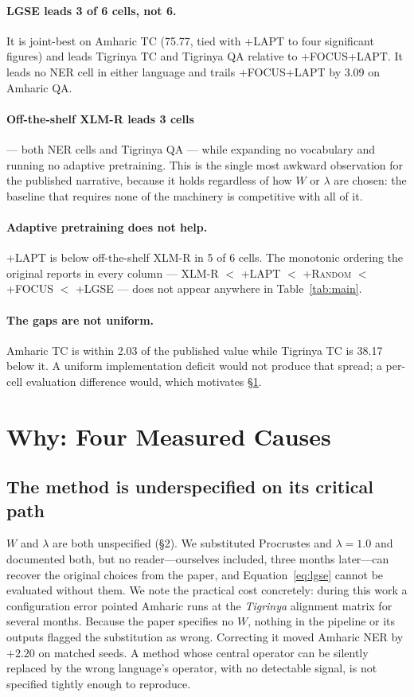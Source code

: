 \documentclass[11pt]{article}
\begin{document}
\paragraph{LGSE leads 3 of 6 cells, not 6.} It is joint-best on Amharic TC
(75.77, tied with \textsc{+LAPT} to four significant figures) and leads
Tigrinya TC and Tigrinya QA relative to \textsc{+FOCUS+LAPT}. It leads no
NER cell in either language and trails \textsc{+FOCUS+LAPT} by 3.09 on
Amharic QA.

\paragraph{Off-the-shelf XLM-R leads 3 cells} --- both NER cells and
Tigrinya QA --- while expanding no vocabulary and running no adaptive
pretraining. This is the single most awkward observation for the published
narrative, because it holds regardless of how $W$ or $\lambda$ are chosen:
the baseline that requires none of the machinery is competitive with all of
it.

\paragraph{Adaptive pretraining does not help.} \textsc{+LAPT} is below
off-the-shelf XLM-R in 5 of 6 cells. The monotonic ordering the original
reports in every column --- XLM-R $<$ \textsc{+LAPT} $<$
\textsc{+Random} $<$ \textsc{+FOCUS} $<$ \textsc{+LGSE} --- does not appear
anywhere in Table~\ref{tab:main}.

\paragraph{The gaps are not uniform.} Amharic TC is within 2.03 of the
published value while Tigrinya TC is 38.17 below it. A uniform
implementation deficit would not produce that spread; a per-cell evaluation
difference would, which motivates \S\ref{sec:why}.

\section{Why: Four Measured Causes}
\label{sec:why}

\subsection{The method is underspecified on its critical path}

$W$ and $\lambda$ are both unspecified (\S2). We substituted Procrustes and
$\lambda=1.0$ and documented both, but no reader---ourselves included, three
months later---can recover the original choices from the paper, and
Equation~\ref{eq:lgse} cannot be evaluated without them. We note the practical cost concretely: during this
work a configuration error pointed Amharic runs at the \textit{Tigrinya}
alignment matrix for several months. Because the paper specifies no $W$,
nothing in the pipeline or its outputs flagged the substitution as wrong.
Correcting it moved Amharic NER by $+2.20$ on matched seeds. A method whose
central operator can be silently replaced by the wrong language's operator,
with no detectable signal, is not specified tightly enough to reproduce.
\end{document}
